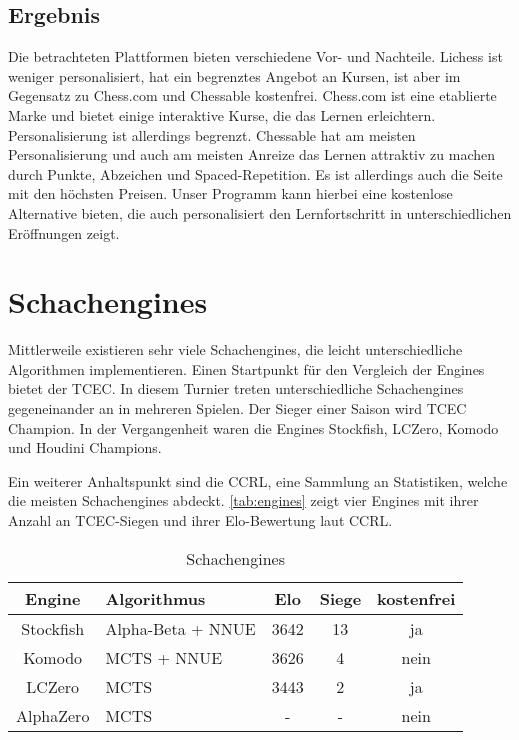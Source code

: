\subsection{Ergebnis}
Die betrachteten Plattformen bieten verschiedene Vor- und Nachteile. Lichess ist weniger personalisiert, hat ein begrenztes Angebot an Kursen, ist aber im Gegensatz zu Chess.com und Chessable kostenfrei. Chess.com ist eine etablierte Marke und bietet einige interaktive Kurse, die das Lernen erleichtern. Personalisierung ist allerdings begrenzt. Chessable hat am meisten Personalisierung und auch am meisten Anreize das Lernen attraktiv zu machen durch Punkte, Abzeichen und Spaced-Repetition. Es ist allerdings auch die Seite mit den höchsten Preisen.
Unser Programm kann hierbei eine kostenlose Alternative bieten, die auch personalisiert den Lernfortschritt in unterschiedlichen Eröffnungen zeigt.

\section{Schachengines}
Mittlerweile existieren sehr viele Schachengines, die leicht unterschiedliche Algorithmen implementieren.
Einen Startpunkt für den Vergleich der Engines bietet der \ac{TCEC}. In diesem Turnier treten unterschiedliche Schachengines gegeneinander an in mehreren Spielen. Der Sieger einer Saison wird  \ac{TCEC} Champion. In der Vergangenheit waren die Engines Stockfish, LCZero, Komodo und Houdini Champions. \cite{tcec_chessdom_tcec-chess_2025}

Ein weiterer Anhaltspunkt sind die \acf{CCRL}, eine Sammlung an Statistiken, welche die meisten Schachengines abdeckt. \cite{ccrl_team_ccrl_2025}
\autoref{tab:engines} zeigt vier Engines mit ihrer Anzahl an \ac{TCEC}-Siegen und ihrer Elo-Bewertung laut \ac{CCRL}.

\begin{table}[h]
    \centering
    \begin{tabular}{|c|l|c|c|c|}
        \hline
        Engine & Algorithmus & Elo & Siege & kostenfrei \\
        \hline
        Stockfish & Alpha-Beta + \acs{NNUE} & 3642 & 13 & ja \\
        \hline
        Komodo & \acs{MCTS} + \acs{NNUE} & 3626 & 4 & nein \\
        \hline
        LCZero & \acs{MCTS} & 3443 & 2 & ja \\
        \hline
        AlphaZero & \acs{MCTS} & - & - & nein \\
        \hline
    \end{tabular}
    \caption{Schachengines}
    \label{tab:engines}
\end{table}

